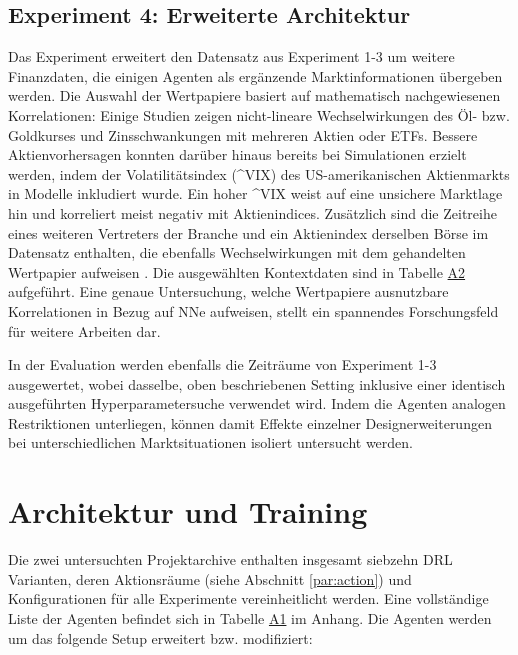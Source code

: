\subsection{Experiment 4: Erweiterte Architektur}
\label{subsec:experiment4}

Das Experiment erweitert den Datensatz aus Experiment 1-3 um weitere Finanzdaten, die einigen Agenten als ergänzende Marktinformationen übergeben werden.
Die Auswahl der Wertpapiere basiert auf mathematisch nachgewiesenen Korrelationen: Einige Studien zeigen nicht-lineare Wechselwirkungen des Öl- bzw. Goldkurses \parencite{stockoil,seigel2020stocks,spillover} und Zinsschwankungen \parencites{interest} mit mehreren Aktien oder \acs{ETF}s. 
Bessere Aktienvorhersagen konnten darüber hinaus bereits bei Simulationen \parencite{vix} erzielt werden, indem der Volatilitätsindex (\acs{^VIX}) des US-amerikanischen Aktienmarkts in Modelle inkludiert wurde. Ein hoher \acs{^VIX} weist auf eine unsichere Marktlage hin und korreliert meist negativ mit Aktienindices.
Zusätzlich sind die Zeitreihe eines weiteren Vertreters der Branche und ein Aktienindex derselben Börse im Datensatz enthalten, die ebenfalls Wechselwirkungen mit dem gehandelten Wertpapier aufweisen \parencites{clusterbranche,corrindex}.
Die ausgewählten Kontextdaten sind in Tabelle \hyperref[tabe2]{A2} aufgeführt. Eine genaue Untersuchung, welche Wertpapiere ausnutzbare Korrelationen in Bezug auf \acs{NN}e aufweisen, stellt ein spannendes Forschungsfeld für weitere Arbeiten dar.

In der Evaluation werden ebenfalls die Zeiträume von Experiment 1-3 ausgewertet, wobei dasselbe, oben beschriebenen Setting inklusive einer identisch ausgeführten Hyperparametersuche verwendet wird.
Indem die Agenten analogen Restriktionen unterliegen, können damit Effekte einzelner Designerweiterungen bei unterschiedlichen Marktsituationen isoliert untersucht werden.

\section{Architektur und Training}

Die zwei untersuchten Projektarchive \parencite{repo1,repo2} enthalten insgesamt siebzehn \acs{DRL} Varianten, deren Aktionsräume (siehe Abschnitt \ref{par:action}) und Konfigurationen für alle Experimente vereinheitlicht werden. Eine vollständige Liste der Agenten befindet sich in Tabelle \hyperref[tabe1]{A1} im Anhang.
Die Agenten werden um das folgende Setup erweitert bzw. modifiziert:

